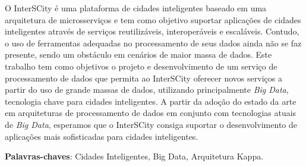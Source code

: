 \begin{resumo}

    O InterSCity é uma plataforma de cidades inteligentes baseado em uma
    arquitetura de microsserviços e tem como objetivo suportar aplicações de
    cidades inteligentes através de serviços reutilizáveis, interoperáveis e
    escaláveis. Contudo, o uso de ferramentas adequadas no
    processamento de seus dados ainda não se faz presente, sendo um obstáculo
    em cenários de maior massa de dados. Este trabalho tem como objetivos o
    projeto e desenvolvimento de um serviço de processamento de dados que
    permita ao InterSCity oferecer novos serviços a partir do uso de grande
    massas de dados, utilizando principalmente \textit{Big Data}, tecnologia chave para
    cidades inteligentes. A partir da adoção do estado da arte em arquiteturas
    de processamento de dados em conjunto com tecnologias atuais de \textit{Big Data},
    esperamos que o InterSCity consiga suportar o desenvolvimento de aplicações
    mais sofisticadas para cidades inteligentes.

 \vspace{\onelineskip}
 \noindent
 \textbf{Palavras-chaves}: Cidades Inteligentes, Big Data, Arquitetura Kappa.
\end{resumo}
